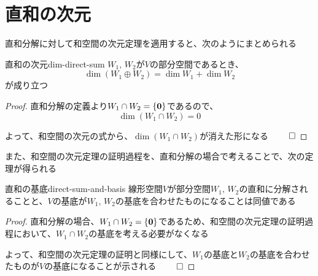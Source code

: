 \documentclass[../../../topic_linear-algebra]{subfiles}
\begin{document}
\sectionline
\section{直和の次元}

\begin{mindflow}
\end{mindflow}

直和分解に対して和空間の次元定理を適用すると、次のようにまとめられる

\begin{theorem}{直和の次元}{dim-direct-sum}
  $W_1,\,W_2$が$V$の部分空間であるとき、
  \begin{equation*}
    \dim(W_1 \oplus W_2) = \dim W_1 + \dim W_2
  \end{equation*}
  が成り立つ
\end{theorem}

\begin{proof}
  直和分解の定義より$W_1 \cap W_2 = \{ \vb*{0} \}$であるので、
  \begin{equation*}
    \dim(W_1 \cap W_2) = 0
  \end{equation*}

  よって、和空間の次元の式から、$\dim(W_1 \cap W_2)$が消えた形になる $\qed$
\end{proof}

\sectionline

また、和空間の次元定理の証明過程を、直和分解の場合で考えることで、次の定理が得られる

\begin{theorem}{直和の基底}{direct-sum-and-basis}
  線形空間$V$が部分空間$W_1,\,W_2$の直和に分解されることと、$V$の基底が$W_1,\,W_2$の基底を合わせたものになることは同値である
\end{theorem}

\begin{proof}
  直和分解の場合、$W_1 \cap W_2 = \{ \vb*{0} \}$であるため、和空間の次元定理の証明過程において、$W_1 \cap W_2$の基底を考える必要がなくなる

  \br

  よって、和空間の次元定理の証明と同様にして、$W_1$の基底と$W_2$の基底を合わせたものが$V$の基底になることが示される $\qed$
\end{proof}
\end{document}
